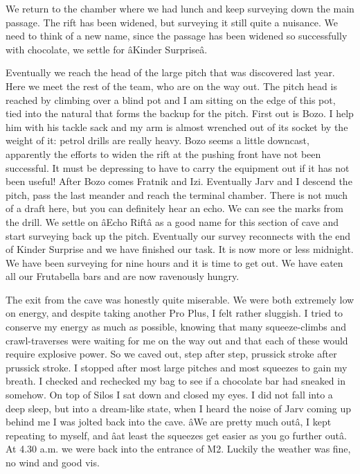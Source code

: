 We return to the chamber where we had lunch and keep surveying down the
main passage. The rift has been widened, but surveying it still quite a
nuisance. We need to think of a new name, since the passage has been
widened so successfully with chocolate, we settle for âKinder
Surpriseâ.

Eventually we reach the head of the large pitch that was discovered last
year. Here we meet the rest of the team, who are on the way out. The
pitch head is reached by climbing over a blind pot and I am sitting on
the edge of this pot, tied into the natural that forms the backup for
the pitch. First out is Bozo. I help him with his tackle sack and my arm
is almost wrenched out of its socket by the weight of it: petrol drills
are really heavy. Bozo seems a little downcast, apparently the efforts
to widen the rift at the pushing front have not been successful. It must
be depressing to have to carry the equipment out if it has not been
useful! After Bozo comes Fratnik and Izi. Eventually Jarv and I descend
the pitch, pass the last meander and reach the terminal chamber. There
is not much of a draft here, but you can definitely hear an echo. We can
see the marks from the drill. We settle on âEcho Riftâ as a good
name for this section of cave and start surveying back up the pitch.
Eventually our survey reconnects with the end of Kinder Surprise and we
have finished our task. It is now more or less midnight. We have been
surveying for nine hours and it is time to get out. We have eaten all
our Frutabella bars and are now ravenously hungry.

The exit from the cave was honestly quite miserable. We were both
extremely low on energy, and despite taking another Pro Plus, I felt
rather sluggish. I tried to conserve my energy as much as possible,
knowing that many squeeze-climbs and crawl-traverses were waiting for me
on the way out and that each of these would require explosive power. So
we caved out, step after step, prussick stroke after prussick stroke. I
stopped after most large pitches and most squeezes to gain my breath. I
checked and rechecked my bag to see if a chocolate bar had sneaked in
somehow. On top of Silos I sat down and closed my eyes. I did not fall
into a deep sleep, but into a dream-like state, when I heard the noise
of Jarv coming up behind me I was jolted back into the cave. âWe are
pretty much outâ, I kept repeating to myself, and âat least the
squeezes get easier as you go further outâ. At 4.30 a.m. we were back
into the entrance of M2. Luckily the weather was fine, no wind and good
vis.

